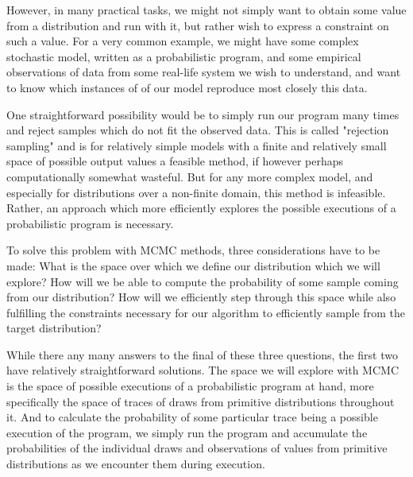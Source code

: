 However, in many practical tasks, we might not simply want to obtain some value from a distribution and run with it, but rather wish to express a constraint on such a value. For a very common example, we might have some complex stochastic model, written as a probabilistic program, and some empirical observations of data from some real-life system we wish to understand, and want to know which instances of of our model reproduce most closely this data.

One straightforward possibility would be to simply run our program many times and reject samples which do not fit the observed data. This is called "rejection sampling" and is for relatively simple models with a finite and relatively small space of possible output values a feasible method, if however perhaps computationally somewhat wasteful. But for any more complex model, and especially for distributions over a non-finite domain, this method is infeasible. Rather, an approach which more efficiently explores the possible executions of a probabilistic program is necessary.

To solve this problem with MCMC methods, three considerations have to be made: What is the space over which we define our distribution which we will explore? How will we be able to compute the probability of some sample coming from our distribution? How will we efficiently step through this space while also fulfilling the constraints necessary for our algorithm to efficiently sample from the target distribution?

While there any many answers to the final of these three questions, the first two have relatively straightforward solutions. The space we will explore with MCMC is the space of possible executions of a probabilistic program at hand, more specifically the space of traces of draws from primitive distributions throughout it. And to calculate the probability of some particular trace being a possible execution of the program, we simply run the program and accumulate the probabilities of the individual draws and observations of values from primitive distributions as we encounter them during execution.
